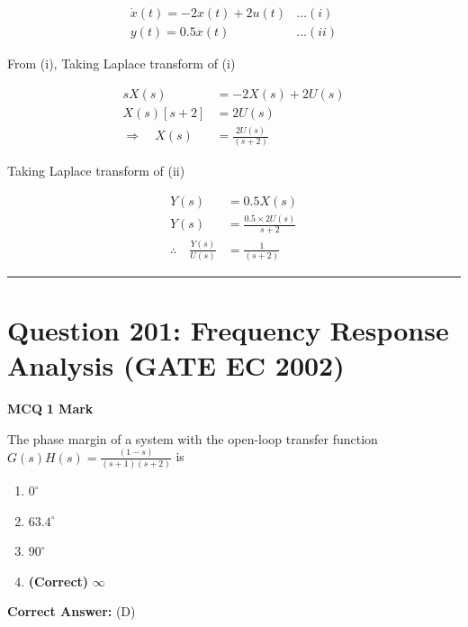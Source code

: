\documentclass[11pt,a4paper]{article}
\begin{document}
\begin{tcolorbox}[solbox, title=Detailed Solution -- Question 200]
\[
\begin{aligned} \dot{x}(t)=-2 x(t)+2 u(t) &\ldots(i)\\ y(t)=0.5 x(t)&\ldots(ii) \end{aligned}
\]

 From (i), Taking Laplace transform of (i)

\[
\begin{aligned} s X(s)&=-2 X(s)+2 U(s)\\ X(s)[s+2]&=2 U(s)\\ \Rightarrow \quad X(s)&=\frac{2 U(s)}{(s+2)} \end{aligned}
\]

 Taking Laplace transform of (ii)

\[
\begin{aligned} Y(s)&=0.5 X(s) \\ Y(s)&=\frac{0.5 \times 2 U(s)}{s+2} \\ \therefore \quad \frac{Y(s)}{U(s)}&=\frac{1}{(s+2)} \end{aligned}
\]
\end{tcolorbox}

\vspace{1.5em}
\hrule
\vspace{1.5em}

\section*{Question 201: Frequency Response Analysis (GATE EC 2002)}
\noindent \textbf{\color{primary}MCQ} \hfill \textbf{\color{secondary}1 Mark}


\noindent The phase margin of a system with the open-loop transfer function $G(s)H(s)=\frac{(1-s)}{(s+1)(s+2)}$ is


\begin{enumerate}[label=(\Alph*)]
    \item $0^{\circ}$
    \item $63.4^{\circ}$
    \item $90^{\circ}$
    \item \textbf{(Correct)} $\infty$
\end{enumerate}

\noindent \textbf{Correct Answer:} (D)
\end{document}
